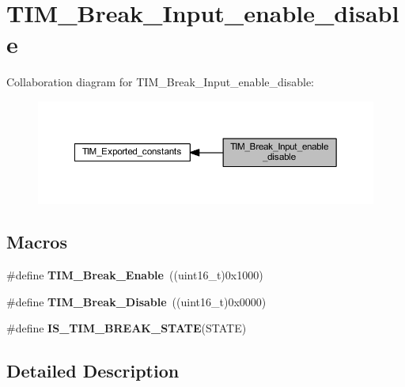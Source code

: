 \hypertarget{group___t_i_m___break___input__enable__disable}{}\section{T\+I\+M\+\_\+\+Break\+\_\+\+Input\+\_\+enable\+\_\+disable}
\label{group___t_i_m___break___input__enable__disable}
Collaboration diagram for T\+I\+M\+\_\+\+Break\+\_\+\+Input\+\_\+enable\+\_\+disable\+:\nopagebreak
\begin{figure}[H]
\begin{center}
\leavevmode
\includegraphics[width=350pt]{group___t_i_m___break___input__enable__disable}
\end{center}
\end{figure}
\subsection*{Macros}
\begin{DoxyCompactItemize}
\item 
\mbox{\label{group___t_i_m___break___input__enable__disable_gae7fbc11ac043454b2a880bffe98fdb8c}} 
\#define {\bfseries T\+I\+M\+\_\+\+Break\+\_\+\+Enable}~((uint16\+\_\+t)0x1000)
\item 
\mbox{\label{group___t_i_m___break___input__enable__disable_ga31ba16dd70ad4d99adc911f7bf6662e5}} 
\#define {\bfseries T\+I\+M\+\_\+\+Break\+\_\+\+Disable}~((uint16\+\_\+t)0x0000)
\item 
\#define {\bfseries I\+S\+\_\+\+T\+I\+M\+\_\+\+B\+R\+E\+A\+K\+\_\+\+S\+T\+A\+TE}(S\+T\+A\+TE)
\end{DoxyCompactItemize}


\subsection{Detailed Description}



